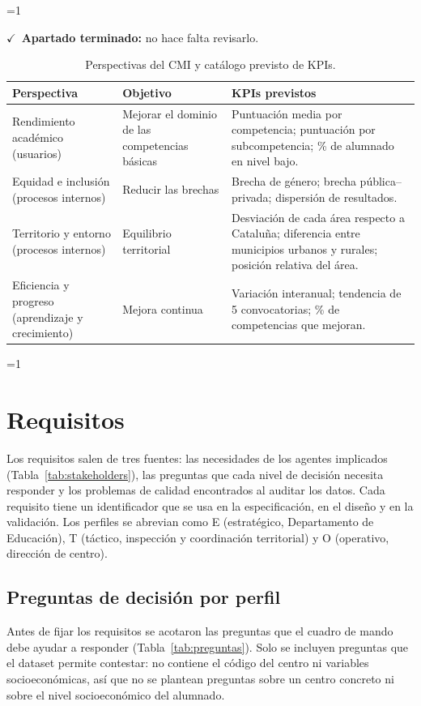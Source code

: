 \documentclass[12pt, a4paper, oneside]{report}
\newcommand{\mostrarterminados}{1}
\newenvironment{revisado}
  {\ifnum\mostrarterminados=1\relax\begin{cajarevisada}\noindent\colorbox{verdeterminado}{\parbox{\dimexpr\linewidth-2\fboxsep\relax}{\small$\checkmark$\ \textbf{Apartado terminado:} no hace falta revisarlo.}}\par\medskip\fi}
  {\ifnum\mostrarterminados=1\relax\end{cajarevisada}\fi}
\begin{document}
\begin{revisado}
\begin{table}[H]
\centering
\small
\renewcommand{\arraystretch}{1.1}
\begin{tabularx}{\textwidth}{@{} p{3.4cm} p{3.6cm} X @{}}
\toprule
\textbf{Perspectiva} & \textbf{Objetivo} & \textbf{KPIs previstos} \\ \midrule
Rendimiento académico (usuarios) & Mejorar el dominio de las competencias básicas & Puntuación media por competencia; puntuación por subcompetencia; \% de alumnado en nivel bajo. \\ \addlinespace
Equidad e inclusión (procesos internos) & Reducir las brechas & Brecha de género; brecha pública--privada; dispersión de resultados. \\ \addlinespace
Territorio y entorno (procesos internos) & Equilibrio territorial & Desviación de cada área respecto a Cataluña; diferencia entre municipios urbanos y rurales; posición relativa del área. \\ \addlinespace
Eficiencia y progreso (aprendizaje y crecimiento) & Mejora continua & Variación interanual; tendencia de 5 convocatorias; \% de competencias que mejoran. \\ \bottomrule
\end{tabularx}
\caption{Perspectivas del CMI y catálogo previsto de KPIs.}
\label{tab:kpis}
\end{table}
\end{revisado}

\section{Requisitos}
\label{sec:requisitos}
Los requisitos salen de tres fuentes: las necesidades de los agentes implicados (Tabla~\ref{tab:stakeholders}), las preguntas que cada nivel de decisión necesita responder y los problemas de calidad encontrados al auditar los datos. Cada requisito tiene un identificador que se usa en la especificación, en el diseño y en la validación. Los perfiles se abrevian como E (estratégico, Departamento de Educación), T (táctico, inspección y coordinación territorial) y O (operativo, dirección de centro).

\subsection{Preguntas de decisión por perfil}
\label{sec:preguntas}
Antes de fijar los requisitos se acotaron las preguntas que el cuadro de mando debe ayudar a responder (Tabla~\ref{tab:preguntas}). Solo se incluyen preguntas que el dataset permite contestar: no contiene el código del centro ni variables socioeconómicas, así que no se plantean preguntas sobre un centro concreto ni sobre el nivel socioeconómico del alumnado.
\end{document}
